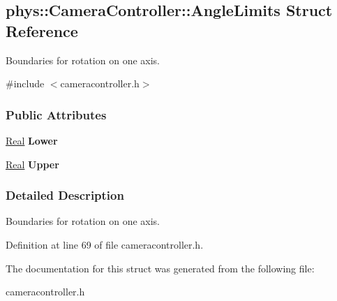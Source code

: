 \hypertarget{structphys_1_1CameraController_1_1AngleLimits}{
\subsection{phys::CameraController::AngleLimits Struct Reference}
\label{structphys_1_1CameraController_1_1AngleLimits}
}


Boundaries for rotation on one axis.  




{\ttfamily \#include $<$cameracontroller.h$>$}

\subsubsection*{Public Attributes}
\begin{DoxyCompactItemize}
\item 
\hypertarget{structphys_1_1CameraController_1_1AngleLimits_abd9211130ba87af89f57760936491762}{
\hyperlink{namespacephys_af7eb897198d265b8e868f45240230d5f}{Real} {\bfseries Lower}}
\label{structphys_1_1CameraController_1_1AngleLimits_abd9211130ba87af89f57760936491762}

\item 
\hypertarget{structphys_1_1CameraController_1_1AngleLimits_a901b87bdfec7270a2b81e31d1313e8a6}{
\hyperlink{namespacephys_af7eb897198d265b8e868f45240230d5f}{Real} {\bfseries Upper}}
\label{structphys_1_1CameraController_1_1AngleLimits_a901b87bdfec7270a2b81e31d1313e8a6}

\end{DoxyCompactItemize}


\subsubsection{Detailed Description}
Boundaries for rotation on one axis. 

Definition at line 69 of file cameracontroller.h.



The documentation for this struct was generated from the following file:\begin{DoxyCompactItemize}
\item 
cameracontroller.h\end{DoxyCompactItemize}
